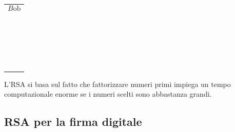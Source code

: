\documentclass[a4paper,12pt, oneside]{book}
\begin{document}
\hfill
\begin{minipage}{0.20\textwidth}
	\begin{tabular}{|p{\textwidth}}

		$$B\mbox{ob}$$ \\\\\\\\\\\\\\\\\\\\\\\\\\\\\\\\\\\\\\\\\\\\\\
	\end{tabular}
\end{minipage}%

\newpage

\begin{osservazione}
	L'RSA si basa sul fatto che fattorizzare numeri primi impiega un tempo computazionale enorme se i numeri scelti sono abbastanza grandi.
\end{osservazione}


\newpage

\subsection{RSA per la \textbf{firma digitale}}
\end{document}
